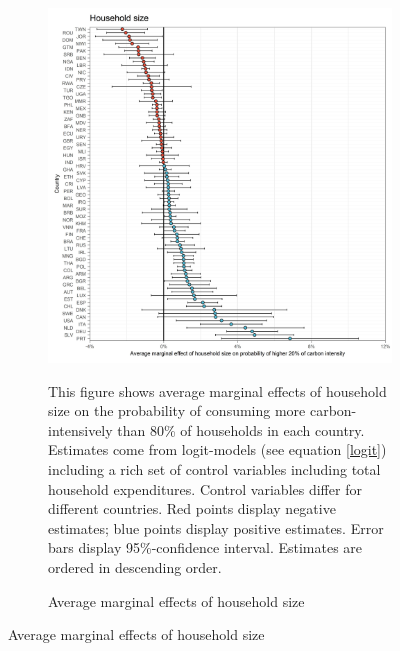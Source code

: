  \begin{figure}[ht!]\ContinuedFloat
   \centering
   \begin{subfigure}[b]{\textwidth}
   \centering
   \caption{Average marginal effects of household size} \label{fig:Logit_ME_size}
   \includegraphics{1_Figures/Analysis_Logit_Models_Marginal_Effects/Average_Marginal_Effects_affected_upper_80_hh_size_2017.jpg}
   \begin{subcaption2}
     This figure shows average marginal effects of household size on the probability of consuming more carbon-intensively than 80\% of households in each country. Estimates come from logit-models (see equation \ref{logit}) including a rich set of control variables including total household expenditures. Control variables differ for different countries. Red points display negative estimates; blue points display positive estimates. Error bars display 95\%-confidence interval. Estimates are ordered in descending order.
   \end{subcaption2}
   \end{subfigure}
 \end{figure}
 \clearpage

